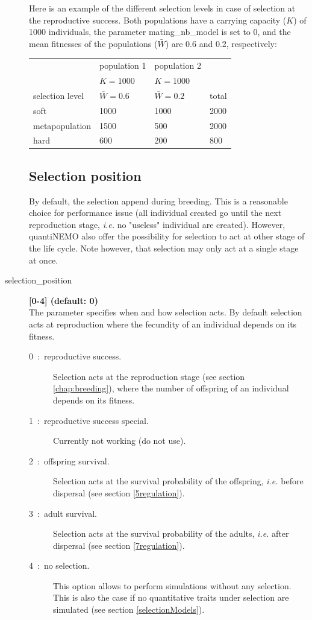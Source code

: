 \documentclass[letterpaper,12pt,oneside]{book}
\begin{document}
\begin{description}
Here is an example of the different selection levels in case of selection at the reproductive success. Both populations have a carrying capacity ($K$) of 1000 individuals, the parameter \textsf{mating\_nb\_model} is set to 0, and the mean fitnesses of the populations ($\bar{W}$) are 0.6 and 0.2, respectively:\\
\begin{tabular*}{0.92\textwidth}{llll}
 \hline             & population 1    & population 2   & \\ 
                    & $K = 1000$      & $K = 1000$     & \\
 selection level&   $\bar{W} = 0.6$ & $\bar{W} = 0.2$& total\\
 \hline
 soft               & 1000            & 1000           & 2000\\
 metapopulation     & 1500            & 500            & 2000\\
 hard               & 600             & 200            & 800\\
 \hline
\end{tabular*}

\subsection{Selection position}
By default, the selection append during breeding. This is a reasonable choice for performance issue (all individual created go until the next reproduction stage, \textit{i.e.} no "useless" individual are created). However, quantiNEMO also offer the possibility for selection to act at other stage of the life cycle. Note however, that selection may only act at a single stage at once. 
\item[selection\_position\index{selection\_position}] \textbf{[0-4] (default: 0)}\\
The parameter specifies when and how selection acts. By default selection acts at reproduction where the fecundity of an individual depends on its fitness.
\begin{description}
\item [0~:~reproductive success.] Selection acts at the reproduction stage (see section \ref{chap:breeding}), where the number of offspring of an individual depends on its fitness.
\item [1~:~reproductive success special.] Currently not working (do not use). 
\item [2~:~offspring survival.] Selection acts at the survival probability of the offspring, \textit{i.e.} before dispersal (see section \ref{5regulation}).
\item [3~:~adult survival.] Selection acts at the survival probability of the adults, \textit{i.e.} after dispersal (see section \ref{7regulation}).
\item [4~:~no selection.] This option allows to perform simulations without any selection. This is also the case if no quantitative traits under selection are simulated (see section \ref{selectionModels}).
\end{description}


\end{description}
\end{document}
